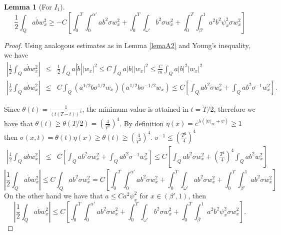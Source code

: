 \documentclass[11pt,oneside,a4papper]{osajnl}
\newtheorem{lema}{Lemma}
\begin{document}
\begin{lema}[For $I_1$]\label{lemaA2_1}
$$\frac{1}{2}\int_{Q}a\dot{b} w_x^2 \geq -C\left[ \int_{0}^{T} \int_{0}^{\alpha'} ab^2\sigma w_x^2+  \int_{0}^{T} \int_{\omega'}b^2\sigma w_x^2+\int_{0}^{T} \int_{\beta'}^{1}a^2b^2\psi_{x}^2 \sigma w_x^2  \right]$$
\end{lema}
\begin{proof}
Using analogous estimates as in Lemma \ref{lemaA2} and Young's inequality, we have 
	\begin{eqnarray*}
		\left| \frac{1}{2}\int_{Q}a\dot{b} w_x^2 \right|&\leq &\frac{1}{2}\int_{Q}a|\dot{b}| |w_x|^2\leq  C\int_{Q}a|b| |w_x|^2\leq  \frac{C}{m}\int_{Q}a|b|^2|w_x|^2\\
		\left|\frac{1}{2}\int_{Q}a\dot{b} w_x^2 \right|&\leq & C\int_{Q}\left(a^{1/2}b\sigma^{1/2} w_x  \right)\left( a^{1/2}b\sigma^{-1/2} w_x  \right)\leq C\left[\int_{Q}ab^2\sigma w_x^2+\int_{Q}ab^2\sigma^{-1} w_x^2   \right].
	\end{eqnarray*}	
    
Since $\theta(t)=\frac{1}{(t(T-t))^4}$, the minimum value is attained in $t=T/2$, therefore we have that $\theta(t)\geq \theta(T/2)=\left(\frac{4}{T^2}\right)^4$. By definition  $\eta(x)=e^{\lambda(|\psi|_\infty+\psi)}\geq 1$ then $\sigma(x,t)=\theta(t)\eta(x)\geq \theta(t)\geq \left(\frac{4}{T^2}\right)^4$.
	$\sigma^{-1}\leq \left(\frac{T^2}{4}\right)^4$
	\begin{eqnarray*}
		\left|\frac{1}{2}\int_{Q}a\dot{b} w_x^2 \right|&\leq & C\left[\int_{Q}ab^2\sigma w_x^2+\int_{Q}ab^2\sigma^{-1} w_x^2   \right]\leq  C\left[\int_{Q}ab^2\sigma w_x^2+\left(\frac{T^2}{4}\right)^4\int_{Q}ab^2 w_x^2   \right]
\end{eqnarray*}		
$$\left|\frac{1}{2}\int_{Q}a\dot{b} w_x^2 \right|\leq C \int_{Q}ab^2\sigma w_x^2= C\left[ \int_{0}^{T} \int_{0}^{\alpha'} ab^2\sigma w_x^2+  \int_{0}^{T} \int_{\omega'}ab^2\sigma w_x^2+\int_{0}^{T} \int_{\beta'}^{1}ab^2\sigma w_x^2  \right]$$
On the other hand we have that $a\leq Ca^2\psi_{x}^2$ for $x\in (\beta',1)$, then
$$\left|\frac{1}{2}\int_{Q}a\dot{b} w_x^2 \right|\leq C\left[ \int_{0}^{T} \int_{0}^{\alpha'} ab^2\sigma w_x^2+  \int_{0}^{T} \int_{\omega'}b^2\sigma w_x^2+\int_{0}^{T} \int_{\beta'}^{1}a^2b^2\psi_{x}^2 \sigma w_x^2  \right].$$
\end{proof}
\end{document}
